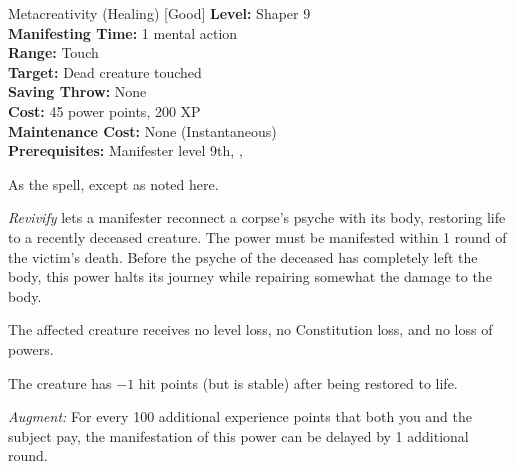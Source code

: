 {Metacreativity (Healing) [Good]}
{
	\textbf{Level:}
	Shaper 9\\
	\textbf{Manifesting Time:}
	1 mental action\\
	\textbf{Range:}
	Touch\\
	\textbf{Target:}
	Dead creature touched\\
	\textbf{Saving Throw:}
	None\\
	\textbf{Cost:}
	45 power points, 200 XP\\
	\textbf{Maintenance Cost:}
	None (Instantaneous)\\
	\textbf{Prerequisites:}
	Manifester level 9th, , \\
}
{
	As the  spell, except as noted here.

	\emph{Revivify} lets a manifester reconnect a corpse's psyche with its body, restoring life to a recently deceased creature. The power must be manifested within 1 round of the victim's death. Before the psyche of the deceased has completely left the body, this power halts its journey while repairing somewhat the damage to the body.

	The affected creature receives no level loss, no Constitution loss, and no loss of powers.

	The creature has $-1$ hit points (but is stable) after being restored to life.

	\textit{Augment:} For every 100 additional experience points that both you and the subject pay, the manifestation of this power can be delayed by 1 additional round.
}